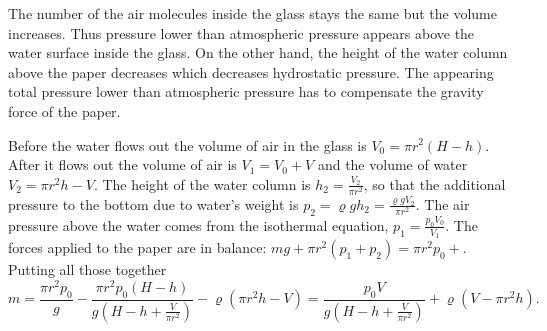 \hinteng
The number of the air molecules inside the glass stays the same but the volume increases. Thus pressure lower than atmospheric pressure appears above the water surface inside the glass. On the other hand, the height of the water column above the paper decreases which decreases hydrostatic pressure. The appearing total pressure lower than atmospheric pressure has to compensate the gravity force of the paper.

\solueng
Before the water flows out the volume of air in the glass is $V_0 = \pi r^2 (H-h)$. After it flows out the volume of air is $V_1 = V_0 + V$ and the volume of water $V_2 = \pi r^2 h - V$. The height of the water column is $h_2 = \frac{ V_2 }{ \pi r^2 }$, so that the additional pressure to the bottom due to water’s weight is $p_2 = \varrho g h_2 = \frac{ \varrho g V_2 }{ \pi r^2 }$. The air pressure above the water comes from the isothermal equation, $p_1 = \frac{p_0 V_0}{V_1}$. The forces applied to the paper are in balance: $mg + \pi r^2 (p_1 + p_2) = \pi r^2 p_0+$. Putting all those together
\[ m =
\frac{ \pi r^2 p_0 }{ g } -
\frac{ \pi r^2 p_0 (H-h) }{ g \left( H - h + \frac{V}{\pi r^2} \right) } -
\varrho \left( \pi r^2 h - V \right)
=
\frac{ p_0 V }{ g \left( H - h + \frac{V}{ \pi r^2 } \right) } + \varrho \left( V - \pi r^2 h \right).
\]
\probend